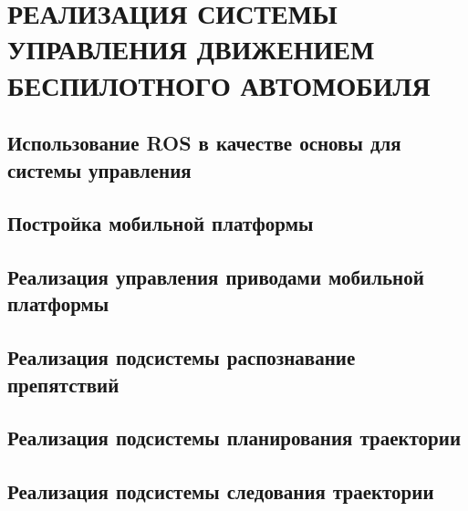 \chapter{РЕАЛИЗАЦИЯ СИСТЕМЫ УПРАВЛЕНИЯ ДВИЖЕНИЕМ БЕСПИЛОТНОГО АВТОМОБИЛЯ}
\section{Использование ROS в качестве основы для системы управления}
\section{Постройка мобильной платформы}
\section{Реализация управления приводами мобильной платформы}
\section{Реализация подсистемы распознавание препятствий}
\section{Реализация подсистемы планирования траектории}
\section{Реализация подсистемы следования траектории}